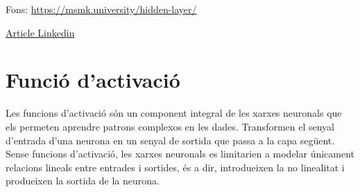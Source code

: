 Fons: \href{https://msmk.university/hidden-layer/}{https://msmk.university/hidden-layer/}

\href{https://www.linkedin.com/advice/0/what-some-examples-linear-nonlinear-models-real-world?lang=es&lang=es&originalSubdomain=es}{Article Linkedin}

\section{
Funció d'activació}\label{sec:3.5.3}
Les funcions d'activació són un component integral de les xarxes neuronals que els permeten aprendre patrons complexos en les dades. Transformen el senyal d'entrada d'una neurona en un senyal de sortida que passa a la capa següent. Sense funcions d'activació, les xarxes neuronals es limitarien a modelar únicament relacions lineals entre entrades i sortides, és a dir, introdueixen la no linealitat i produeixen la sortida de la neurona.

